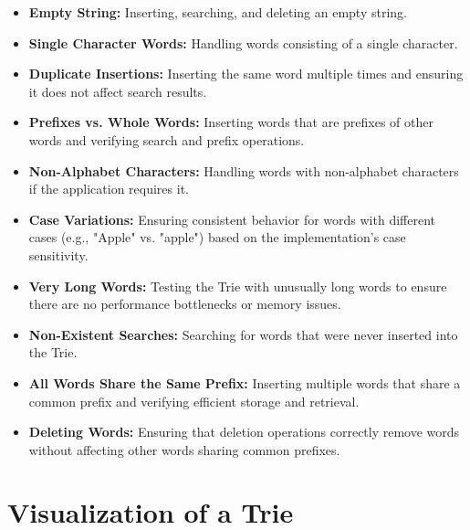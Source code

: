 \begin{itemize}
    \item \textbf{Empty String:} Inserting, searching, and deleting an empty string.
    
    \item \textbf{Single Character Words:} Handling words consisting of a single character.
    
    \item \textbf{Duplicate Insertions:} Inserting the same word multiple times and ensuring it does not affect search results.
    
    \item \textbf{Prefixes vs. Whole Words:} Inserting words that are prefixes of other words and verifying search and prefix operations.
    
    \item \textbf{Non-Alphabet Characters:} Handling words with non-alphabet characters if the application requires it.
    
    \item \textbf{Case Variations:} Ensuring consistent behavior for words with different cases (e.g., "Apple" vs. "apple") based on the implementation's case sensitivity.
    
    \item \textbf{Very Long Words:} Testing the Trie with unusually long words to ensure there are no performance bottlenecks or memory issues.
    
    \item \textbf{Non-Existent Searches:} Searching for words that were never inserted into the Trie.
    
    \item \textbf{All Words Share the Same Prefix:} Inserting multiple words that share a common prefix and verifying efficient storage and retrieval.
    
    \item \textbf{Deleting Words:} Ensuring that deletion operations correctly remove words without affecting other words sharing common prefixes.
\end{itemize}

\section*{Visualization of a Trie}


